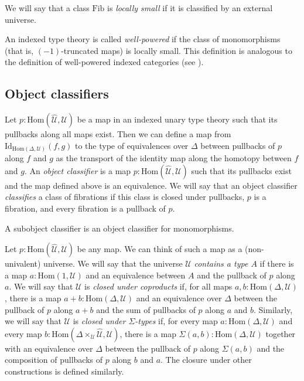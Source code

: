 \documentclass[reqno]{amsart}
\theoremstyle{definition}
\theoremstyle{remark}
\newcommand{\fs}[1]{\mathrm{#1}}
\newcommand{\Hom}{\fs{Hom}}
\newcommand{\Id}{\fs{Id}}
\newcommand{\Fib}{\fs{Fib}}
\numberwithin{figure}{section}
\begin{document}
\begin{defn}
We will say that a class $\Fib$ is \emph{locally small} if it is classified by an external universe.
\end{defn}

\begin{example}
An indexed type theory is called \emph{well-powered} if the class of monomorphisms (that is, $(-1)$-truncated maps) is locally small.
This definition is analogous to the definition of well-powered indexed categories (see \cite[Example~B1.3.14]{elephant}).
\end{example}

\subsection{Object classifiers}

Let $p : \Hom(\widehat{\mathcal{U}},\mathcal{U})$ be a map in an indexed unary type theory such that its pullbacks along all maps exist.
Then we can define a map from $\Id_{\Hom(\Delta,\mathcal{U})}(f,g)$ to the type of equivalences over $\Delta$ between pullbacks of $p$ along $f$ and $g$ as the transport of the identity map along the homotopy between $f$ and $g$.
An \emph{object classifier} is a map $p : \Hom(\widehat{\mathcal{U}},\mathcal{U})$ such that its pullbacks exist and the map defined above is an equivalence.
We will say that an object classifier \emph{classifies} a class of fibrations if this class is closed under pullbacks, $p$ is a fibration, and every fibration is a pullback of $p$.

\begin{example}
A subobject classifier is an object classifier for monomorphisms.
\end{example}

Let $p : \Hom(\widehat{\mathcal{U}},\mathcal{U})$ be any map.
We can think of such a map as a (non-univalent) universe.
We will say that the universe $\mathcal{U}$ \emph{contains a type $A$} if there is a map $a : \Hom(1,\mathcal{U})$ and an equivalence between $A$ and the pullback of $p$ along $a$.
We will say that $\mathcal{U}$ is \emph{closed under coproducts} if, for all maps $a,b : \Hom(\Delta,\mathcal{U})$, there is a map $a + b : \Hom(\Delta,\mathcal{U})$
and an equivalence over $\Delta$ between the pullback of $p$ along $a + b$ and the sum of pullbacks of $p$ along $a$ and $b$.
Similarly, we will say that $\mathcal{U}$ is \emph{closed under $\Sigma$-types} if, for every map $a : \Hom(\Delta,\mathcal{U})$
and every map $b : \Hom(\Delta \times_\mathcal{U} \widehat{\mathcal{U}}, \mathcal{U})$, there is a map $\Sigma(a,b) : \Hom(\Delta,\mathcal{U})$
together with an equivalence over $\Delta$ between the pullback of $p$ along $\Sigma(a,b)$ and the composition of pullbacks of $p$ along $b$ and $a$.
The closure under other constructions is defined similarly.
\end{document}
